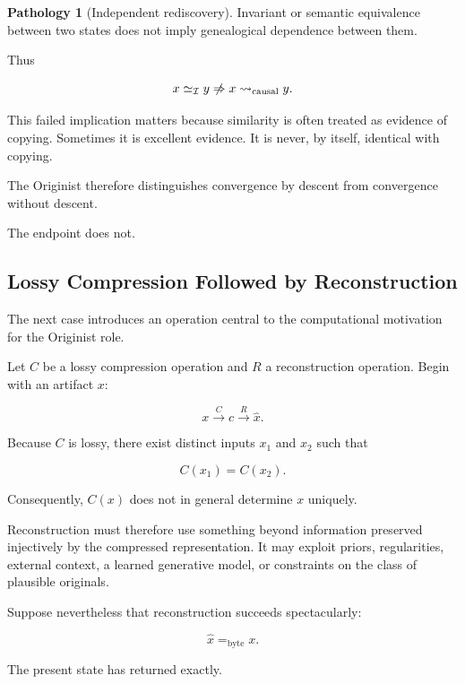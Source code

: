 \documentclass[
  11pt,
  a4paper,
  DIV=12,
  BCOR=0mm,
  parskip=half-
]{scrartcl}
\newcommand{\Inv}{\mathcal I}
\newcommand{\eqbyte}{=_{\mathrm{byte}}}
\newcommand{\simI}{\simeq_{\Inv}}
\newcommand{\leadcausal}{%
  \mathrel{\rightsquigarrow_{\mathrm{causal}}}%
}
\newcommand{\nimplies}{%
  \centernot\Rightarrow
}
\theoremstyle{definition}
\newtheorem{pathology}[definition]{Pathology}
\theoremstyle{plain}
\theoremstyle{remark}
\begin{document}
\begin{pathology}[Independent rediscovery]
\label{path:rediscovery}
Invariant or semantic equivalence between two states does not imply
genealogical dependence between them.
\end{pathology}

Thus

\[
  x\simI y
  \nimplies
  x\leadcausal y.
\]

This failed implication matters because similarity is often treated as
evidence of copying. Sometimes it is excellent evidence. It is never, by
itself, identical with copying.

The Originist therefore distinguishes convergence by descent from convergence
without descent.

The endpoint does not.


\subsection{Lossy Compression Followed by Reconstruction}
\label{sec:lossy-reconstruction}

The next case introduces an operation central to the computational motivation
for the Originist role.

Let \(C\) be a lossy compression operation and \(R\) a reconstruction
operation. Begin with an artifact \(x\):

\[
  x
  \xrightarrow{C}
  c
  \xrightarrow{R}
  \widehat x.
\]

Because \(C\) is lossy, there exist distinct inputs \(x_1\) and \(x_2\) such
that

\[
  C(x_1)=C(x_2).
\]

Consequently, \(C(x)\) does not in general determine \(x\) uniquely.

Reconstruction must therefore use something beyond information preserved
injectively by the compressed representation. It may exploit priors,
regularities, external context, a learned generative model, or constraints on
the class of plausible originals.

Suppose nevertheless that reconstruction succeeds spectacularly:

\[
  \widehat x\eqbyte x.
\]

The present state has returned exactly.
\end{document}
